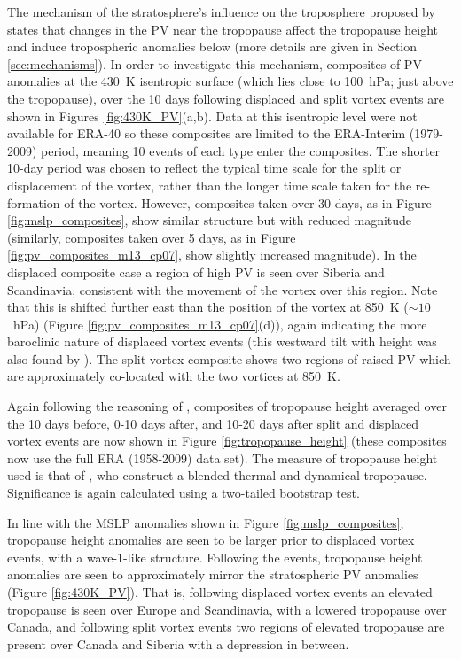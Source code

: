 The mechanism of the stratosphere's influence on the troposphere proposed by
\citet{Ambaum2002} states that changes in the PV near the tropopause affect the
tropopause height and induce tropospheric anomalies below (more details are
given in Section \ref{sec:mechanisms}). In order to investigate this mechanism,
composites of PV anomalies at the 430~K isentropic surface (which lies close to
100~hPa; just above the tropopause), over the 10 days following displaced and
split vortex events are shown in Figures \ref{fig:430K_PV}(a,b). Data at this
isentropic level were not available for ERA-40 so these composites are limited
to the ERA-Interim (1979-2009) period, meaning 10 events of each type enter the
composites. The shorter 10-day period was chosen to reflect the typical time
scale for the split or displacement of the vortex, rather than the longer time
scale taken for the re-formation of the vortex. However, composites taken over
30 days, as in Figure \ref{fig:mslp_composites}, show similar structure but with
reduced magnitude (similarly, composites taken over 5 days, as in Figure
\ref{fig:pv_composites_m13_cp07}, show slightly increased magnitude). In the
displaced composite case a region of high PV is seen over Siberia and
Scandinavia, consistent with the movement of the vortex over this region. Note
that this is shifted further east than the position of the vortex at 850~K
($\sim 10$~hPa) (Figure \ref{fig:pv_composites_m13_cp07}(d)), again indicating
the more baroclinic nature of displaced vortex events (this westward tilt with
height was also found by \citet{Matthewman2009}). The split vortex composite
shows two regions of raised PV which are approximately co-located with the two
vortices at 850~K.

Again following the reasoning of \citet{Ambaum2002}, composites of tropopause
height averaged over the 10 days before, 0-10 days after, and 10-20 days after
split and displaced vortex events are now shown in Figure
\ref{fig:tropopause_height} (these composites now use the full ERA (1958-2009)
data set). The measure of tropopause height used is that of \citet{Wilcox2012},
who construct a blended thermal and dynamical tropopause. Significance is again
calculated using a two-tailed bootstrap test.

In line with the MSLP anomalies shown in Figure \ref{fig:mslp_composites},
tropopause height anomalies are seen to be larger prior to displaced vortex
events, with a wave-1-like structure. Following the events, tropopause height
anomalies are seen to approximately mirror the stratospheric PV anomalies
(Figure \ref{fig:430K_PV}). That is, following displaced vortex events an
elevated tropopause is seen over Europe and Scandinavia, with a lowered
tropopause over Canada, and following split vortex events two regions of
elevated tropopause are present over Canada and Siberia with a depression in
between.

